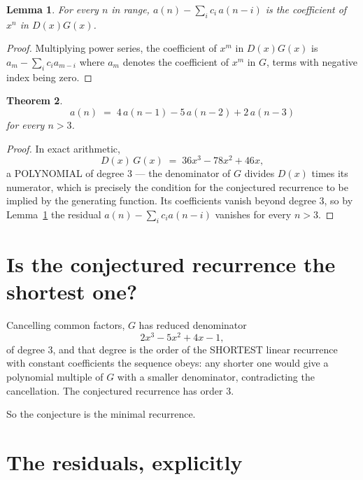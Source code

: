 \documentclass[11pt,a4paper]{article}
\theoremstyle{plain}
\newtheorem{theorem}{Theorem}
\newtheorem{lemma}[theorem]{Lemma}
\theoremstyle{definition}
\begin{document}
\begin{lemma}\label{lem:key}
For every $n$ in range, $a(n)-\sum_i c_i\,a(n-i)$ is the coefficient of $x^{n}$ in
$D(x)G(x)$.
\end{lemma}

\begin{proof}
Multiplying power series, the coefficient of $x^{m}$ in $D(x)G(x)$ is
$a_m-\sum_i c_i a_{m-i}$ where $a_m$ denotes the coefficient of $x^{m}$ in $G$, terms with
negative index being zero.
\end{proof}

\begin{theorem}
\[
a(n)\;=\;4\,a(n-1) - 5\,a(n-2) + 2\,a(n-3)
\]
for every $n>3$.
\end{theorem}

\begin{proof}
In exact arithmetic,
\[
D(x)\,G(x)\;=\;36 x^{3} - 78 x^{2} + 46 x,
\]
a POLYNOMIAL of degree $3$ --- the denominator of $G$ divides $D(x)$ times its numerator,
which is precisely the condition for the conjectured recurrence to be implied by the
generating function. Its coefficients vanish beyond degree $3$, so by
Lemma~\ref{lem:key} the residual $a(n)-\sum_ic_ia(n-i)$ vanishes for every
$n>3$.
\end{proof}

\section{Is the conjectured recurrence the shortest one?}

Cancelling common factors, $G$ has reduced denominator
\[
2 x^{3} - 5 x^{2} + 4 x - 1,
\]
of degree $3$, and that degree is the order of the SHORTEST linear recurrence with
constant coefficients the sequence obeys: any shorter one would give a polynomial multiple of
$G$ with a smaller denominator, contradicting the cancellation. The conjectured recurrence has
order $3$.

So the conjecture is the minimal recurrence.

\section{The residuals, explicitly}
\end{document}
